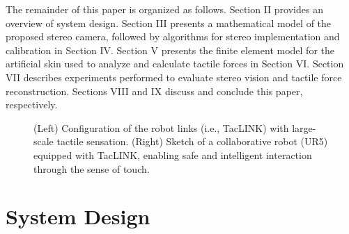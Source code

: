 \documentclass[10pt,letterpaper,journal,final,twoside,twocolumn,nofonttune]{IEEEtran}
\begin{document}
The remainder of this paper is organized as follows. Section II provides an overview of system design. Section III presents a mathematical model of the proposed stereo camera, followed by algorithms for stereo implementation and calibration in Section IV. Section V presents the finite element model for the artificial skin used to analyze and calculate tactile forces in  Section VI. Section VII describes experiments performed to evaluate  stereo vision and tactile force reconstruction. Sections VIII and IX discuss and conclude this paper, respectively.
\begin{figure}[!t]
\caption{(Left) Configuration of the robot links (i.e.,  TacLINK) with large-scale tactile sensation. (Right) Sketch of a collaborative robot (UR5) equipped with TacLINK, enabling safe and intelligent interaction through the sense of touch.}
\label{fig_design}
\end{figure}
\section{System Design}
\end{document}
